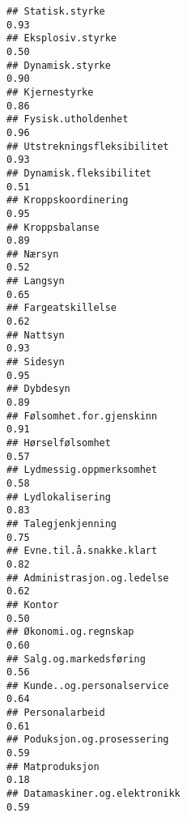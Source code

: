 \documentclass[
]{article}
\begin{document}
\begin{verbatim}
## Statisk.styrke                                                                   0.93
## Eksplosiv.styrke                                                                 0.50
## Dynamisk.styrke                                                                  0.90
## Kjernestyrke                                                                     0.86
## Fysisk.utholdenhet                                                               0.96
## Utstrekningsfleksibilitet                                                        0.93
## Dynamisk.fleksibilitet                                                           0.51
## Kroppskoordinering                                                               0.95
## Kroppsbalanse                                                                    0.89
## Nærsyn                                                                           0.52
## Langsyn                                                                          0.65
## Fargeatskillelse                                                                 0.62
## Nattsyn                                                                          0.93
## Sidesyn                                                                          0.95
## Dybdesyn                                                                         0.89
## Følsomhet.for.gjenskinn                                                          0.91
## Hørselfølsomhet                                                                  0.57
## Lydmessig.oppmerksomhet                                                          0.58
## Lydlokalisering                                                                  0.83
## Talegjenkjenning                                                                 0.75
## Evne.til.å.snakke.klart                                                          0.82
## Administrasjon.og.ledelse                                                        0.62
## Kontor                                                                           0.50
## Økonomi.og.regnskap                                                              0.60
## Salg.og.markedsføring                                                            0.56
## Kunde..og.personalservice                                                        0.64
## Personalarbeid                                                                   0.61
## Poduksjon.og.prosessering                                                        0.59
## Matproduksjon                                                                    0.18
## Datamaskiner.og.elektronikk                                                      0.59

\end{verbatim}
\end{document}
